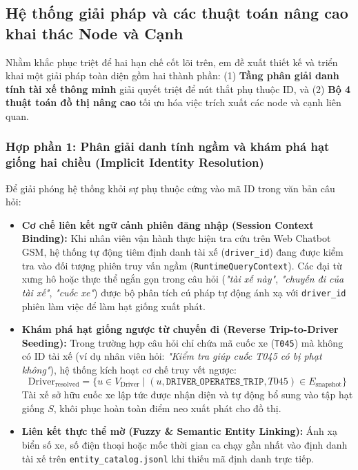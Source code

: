 \documentclass[a4paper,11pt]{article}
\begin{document}
\subsection{Hệ thống giải pháp và các thuật toán nâng cao khai thác Node và Cạnh}
\label{sec:advanced-kg-algorithms}

Nhằm khắc phục triệt để hai hạn chế cốt lõi trên, em đề xuất thiết kế và triển khai một giải pháp toàn diện gồm hai thành phần: (1) \textbf{Tầng phân giải danh tính tài xế thông minh} giải quyết triệt để nút thắt phụ thuộc ID, và (2) \textbf{Bộ 4 thuật toán đồ thị nâng cao} tối ưu hóa việc trích xuất các node và cạnh liên quan.

\subsubsection{Hợp phần 1: Phân giải danh tính ngầm và khám phá hạt giống hai chiều (Implicit Identity Resolution)}
\label{sec:algo-identity-resolution}

Để giải phóng hệ thống khỏi sự phụ thuộc cứng vào mã ID trong văn bản câu hỏi:
\begin{itemize}[leftmargin=1.5em]
    \item \textbf{Cơ chế liên kết ngữ cảnh phiên đăng nhập (Session Context Binding):} Khi nhân viên vận hành thực hiện tra cứu trên Web Chatbot GSM, hệ thống tự động tiêm định danh tài xế (\texttt{driver\_id}) đang được kiểm tra vào đối tượng phiên truy vấn ngầm (\texttt{RuntimeQueryContext}). Các đại từ xưng hô hoặc thực thể ngắn gọn trong câu hỏi (\textit{"tài xế này"}, \textit{"chuyến đi của tài xế"}, \textit{"cuốc xe"}) được bộ phân tích cú pháp tự động ánh xạ với \texttt{driver\_id} phiên làm việc để làm hạt giống xuất phát.
    \item \textbf{Khám phá hạt giống ngược từ chuyến đi (Reverse Trip-to-Driver Seeding):} Trong trường hợp câu hỏi chỉ chứa mã cuốc xe (\texttt{T045}) mà không có ID tài xế (ví dụ nhân viên hỏi: \textit{"Kiểm tra giúp cuốc T045 có bị phạt không"}), hệ thống kích hoạt cơ chế truy vết ngược:
    \begin{equation}
        \text{Driver}_{\text{resolved}} = \big\{ u \in V_{\text{Driver}} \mid (u, \texttt{DRIVER\_OPERATES\_TRIP}, T045) \in E_{\text{snapshot}} \big\}
    \end{equation}
    Tài xế sở hữu cuốc xe lập tức được nhận diện và tự động bổ sung vào tập hạt giống $S$, khôi phục hoàn toàn điểm neo xuất phát cho đồ thị.
    \item \textbf{Liên kết thực thể mờ (Fuzzy \& Semantic Entity Linking):} Ánh xạ biển số xe, số điện thoại hoặc mốc thời gian ca chạy gần nhất vào định danh tài xế trên \nolinkurl{entity_catalog.jsonl} khi thiếu mã định danh trực tiếp.
\end{itemize}
\end{document}
